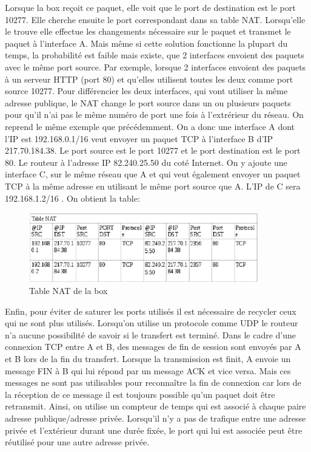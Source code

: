 Lorsque la box reçoit ce paquet, elle voit que le port de destination est le
port 10277. Elle cherche ensuite le port correspondant dans sa table NAT.
Lorsqu'elle le trouve elle effectue les changements nécessaire sur le paquet et
transmet le paquet à l'interface A.
\smallbreak
Mais même si cette solution fonctionne la plupart du temps, la probabilité est
faible mais existe, que 2 interfaces envoient des paquets avec le même port
source. Par exemple, lorsque 2 interfaces envoient des paquets à un serveur
HTTP (port 80) et qu'elles utilisent toutes les deux comme port source 10277.
Pour différencier les deux interfaces, qui vont utiliser la même adresse
publique, le NAT change le port source dans un ou plusieurs paquets pour qu'il
n'ai pas le même numéro de port une fois à l'extrérieur du réseau.  
\smallbreak
On reprend le même exemple que précédemment. On a donc une interface A dont l'IP
est 192.168.0.1/16 veut envoyer un paquet TCP à l'interface B d'IP 217.70.184.38.
Le port source est le port 10277 et le port destination est le port 80. Le
routeur à l'adresse IP  82.240.25.50 du coté Internet.
On y ajoute une interface C, sur le même réseau que A et qui veut également
envoyer un paquet TCP à la même adresse en utilisant le même port source que A. L'IP de C
sera 192.168.1.2/16 .
On obtient la table:

\begin{figure}[h]
\centering
\includegraphics[width=10cm]{./pics/TableNAT2.eps}
\caption{Table NAT de la box}
\label{fig:NAT2}
\end{figure}

Enfin, pour éviter de saturer les ports utilisés il est nécessaire de recycler
 ceux qui ne sont plus utilisés. Lorsqu'on utilise un protocole comme UDP le
routeur n'a aucune possibilité de savoir si le transfert est terminé. 
\smallbreak 
Dans le cadre d'une connexion TCP entre A et B, des messages de fin de
session sont envoyés par A et B lors de la fin du transfert. Lorsque la
transmission est finit, A envoie un message FIN à B qui lui répond par un
message ACK et vice versa. Mais ces messages ne sont pas utilisables pour
reconnaître la fin de connexion car lors de la réception de ce message il est
toujours possible qu'un paquet doit être retransmit. 
\smallbreak
Ainsi, on utilise un compteur de temps qui est associé à chaque paire adresse
publique/adresse privée. Lorsqu'il n'y a pas de trafique entre une adresse
privée et l'extérieur durant une durée fixée, le port qui lui est associée peut
être réutilisé pour une autre adresse privée.

